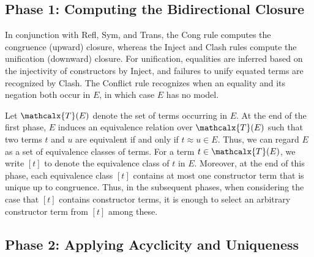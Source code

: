 \documentclass[letter]{article}
\theoremstyle{definition}
\newcommand\Sig{\mathrm{\Sigma}}
\newcommand\const[1]{\textsf{#1}}
\newcommand{\Ec}{E}
\newcommand{\tEc}{\Terms(\Ec)}
\newcommand{\rn}[1]{\textsf{#1}}
\newcommand{\teq}{\approx}
\newcommand{\ec}[1]{[#1]}
\newcommand\Terms{\mathcalx{T}}
\newcommand\negvthinspace{\kern-0.083333em}
\begin{document}

\subsection{Phase 1: Computing the Bidirectional Closure}

In conjunction with \rn{Refl}, \rn{Sym}, and \rn{Trans}, the \rn{Cong} rule computes the congruence (upward) closure,
whereas the \rn{Inject} and \rn{Clash} rules %
compute the unification (downward) closure.
For unification, %
equalities are inferred based on the injectivity of constructors by \rn{Inject},
and failures to unify equated terms are recognized by \rn{Clash}.
The \rn{Conflict} rule recognizes when an equality and its negation both occur in $\Ec$, in which case $\Ec$ has no model.

Let $\tEc$ denote the set of %
terms occurring in $\Ec$.
At the end of the first phase, $\Ec$ induces an equivalence
relation over $\tEc$ such that two terms $t$ and $u$ are equivalent if and
only if $t \teq u \in \Ec$.
Thus, we can regard $\Ec$ as a set of
equivalence classes of terms. For a term $t \in \tEc$, we write $\ec{t}$ to
denote the equivalence class of $t$ in $\Ec$.
Moreover, at the end of this phase, each equivalence class $\ec{t}$ contains
at most %
one constructor term that is unique up to congruence.
Thus, in the subsequent phases, 
when considering the case that $\ec{t}$ contains constructor terms,
it is enough %
to select an arbitrary constructor term from $\ec{t}$ among these.

\subsection{Phase 2: Applying Acyclicity and Uniqueness}
\end{document}
